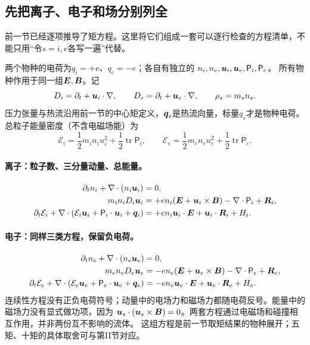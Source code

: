 \subsection{先把离子、电子和场分别列全}\label{sec:full-twofluid}
前一节已经逐项推导了矩方程。这里将它们组成一套可以逐行检查的方程清单，不能只用“令$s=i,e$各写一遍”代替。

两个物种的电荷为$q_i=+e$、$q_e=-e$；各自有独立的
$n_i,n_e,\bm{u}_i,\bm{u}_e,\mathsf P_i,\mathsf P_e$。
所有物种作用于同一组$\bm{E},\bm{B}$。记
\begin{equation}
 D_i=\partial_t+\bm{u}_i\cdot\nabla,\qquad
 D_e=\partial_t+\bm{u}_e\cdot\nabla,\qquad \rho_s=m_sn_s.
\end{equation}
压力张量与热流沿用前一节的中心矩定义，$\bm{q}_s$是热流向量，标量$q_s$才是物种电荷。总粒子能量密度（不含电磁场能）为
\begin{equation}
 \mathcal E_i=\frac12m_in_i u_i^2+\frac12\operatorname{tr}\mathsf P_i,\qquad
 \mathcal E_e=\frac12m_en_e u_e^2+\frac12\operatorname{tr}\mathsf P_e.
 \label{eq:twofluid-energy-def}
\end{equation}

\paragraph{离子：粒子数、三分量动量、总能量。}
\begin{align}
 \partial_t n_i+\nabla\cdot(n_i\bm{u}_i)&=0,
 \label{eq:ion-cont-full}\\
 m_in_iD_i\bm{u}_i
 &=+en_i(\bm{E}+\bm{u}_i\times\bm{B})-\nabla\cdot\mathsf P_i+\bm{R}_i,
 \label{eq:ion-mom-full}\\
 \partial_t\mathcal E_i+
 \nabla\cdot(\mathcal E_i\bm{u}_i+\mathsf P_i\cdot\bm{u}_i+\bm{q}_i)
 &=+en_i\bm{u}_i\cdot\bm{E}+\bm{u}_i\cdot\bm{R}_i+H_i.
 \label{eq:ion-energy-full}
\end{align}
\paragraph{电子：同样三类方程，保留负电荷。}
\begin{align}
 \partial_t n_e+\nabla\cdot(n_e\bm{u}_e)&=0,
 \label{eq:electron-cont-full}\\
 m_en_eD_e\bm{u}_e
 &=-en_e(\bm{E}+\bm{u}_e\times\bm{B})-\nabla\cdot\mathsf P_e+\bm{R}_e,
 \label{eq:electron-mom-full}\\
 \partial_t\mathcal E_e+
 \nabla\cdot(\mathcal E_e\bm{u}_e+\mathsf P_e\cdot\bm{u}_e+\bm{q}_e)
 &=-en_e\bm{u}_e\cdot\bm{E}+\bm{u}_e\cdot\bm{R}_e+H_e.
 \label{eq:electron-energy-full}
\end{align}
连续性方程没有正负电荷符号；动量中的电场力和磁场力都随电荷反号。能量中的磁场力没有显式做功项，因为
$\bm{u}_s\cdot(\bm{u}_s\times\bm{B})=0$。两套方程通过电磁场和碰撞相互作用，并非两份互不影响的流体。
这组方程是前一节取矩结果的物种展开；五矩、十矩的具体取舍可与\citet{Wang2015}第II节对应。

